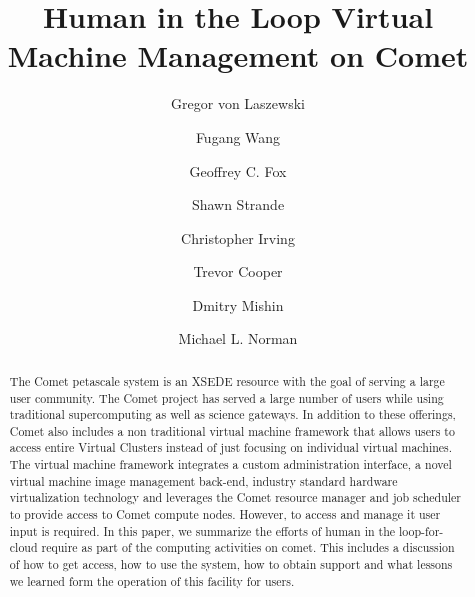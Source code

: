 \documentclass[sigconf,hyphens]{acmart}
\begin{document}
\title{Human in the Loop Virtual Machine Management on Comet}


\author{Gregor von Laszewski}
\author{Fugang Wang}
\author{Geoffrey C. Fox}

\author{Shawn Strande}
\author{Christopher Irving}
\author{Trevor Cooper}
\author{Dmitry Mishin}
\author{Michael L. Norman}

\renewcommand{\shortauthors}{von Laszewski, et al.}

\newcommand{\TODO}[1]{\todo[inline]{#1}}

\begin{abstract}

  The Comet petascale system is an XSEDE resource with the goal of
  serving a large user community. The Comet project has served a large
  number of users while using traditional supercomputing as well as
  science gateways. In addition to these offerings, Comet also
  includes a non traditional virtual machine framework that allows
  users to access entire Virtual Clusters instead of just focusing on
  individual virtual machines. The virtual machine framework
  integrates a custom administration interface, a novel virtual
  machine image management back-end, industry standard hardware
  virtualization technology and leverages the Comet resource manager
  and job scheduler to provide access to Comet compute nodes. However,
  to access and manage it user input is required. In this paper, we
  summarize the efforts of human in the loop-for-cloud require as part
  of the computing activities on comet. This includes a discussion of
  how to get access, how to use the system, how to obtain support and
  what lessons we learned form the operation of this facility for
  users.

\end{abstract}




\maketitle
\end{document}
